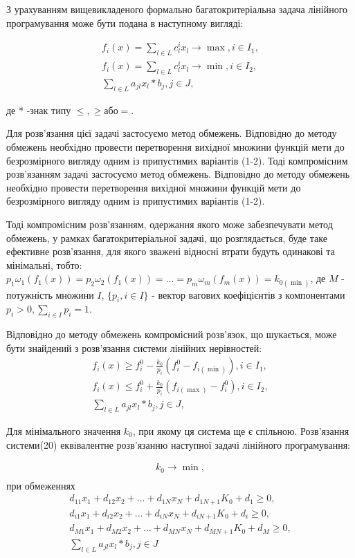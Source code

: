 З урахуванням вищевикладеного формально багатокритеріальна задача лінійного програмування може бути подана в наступному вигляді:

\begin{gather*}
	f_i(x) = \sum_{l \in L}{c_l^i x_l} \to \max, i \in I_1, \\
	f_i(x) = \sum_{l \in L}{c_l^i x_l} \to \min, i \in I_2, \\
	\sum_{l \in L}{a_{jl} x_l * b_j}, j \in J,
\end{gather*}

де * -знак типу $\leq, \geq або =$.

Для розв'язання цієї задачі застосуємо метод обмежень. 
Відповідно до методу обмежень необхідно провести перетворення вихідної множини функцій мети до безрозмірного вигляду одним із припустимих варіантів (1-2). 
Тоді компромісним розв'язанням задачі застосуємо метод обмежень. 
Відповідно до методу обмежень необхідно провести перетворення вихідної множини функцій мети до безрозмірного вигляду одним із припустимих варіантів (1-2). 

Тоді компромісним розв'язанням, одержання якого може забезпечувати метод обмежень, у рамках багатокритеріальної задачі, що розглядається, буде таке ефективне розв'язання, для якого зважені відносні втрати будуть одинакові та мінімальні, тобто:
$p_1 \omega_1 (f_1(x)) = p_2 \omega_2 (f_1(x)) = ... = p_m \omega_m (f_m(x)) = k_{0 (\min)}$,
де $M$ - потужність множини $I$, $\{p_i, i \in I\}$ - вектор вагових коефіцієнтів з компонентами 
$p_i > 0, \sum_{i \in I}{p_i} = 1$.

Відповідно до методу обмежень компромісний розв'язок, що шукається, може бути знайдений з розв'язання системи лінійних нерівностей:
\begin{gather*}
	f_i(x) \geq f_{i}^0 - \frac{k_0}{p_i}(f_{i}^0 - f_{i(\min)}) , i \in I_1, \\
	f_i(x) \leq f_{i}^0 + \frac{k_0}{p_i}(f_{i(\max)} - f_{i}^0 ), i \in I_2, \\
	\sum_{l \in L}{a_{jl} x_l * b_j}, j \in J,
\end{gather*}

Для мінімального значення $k_0$, при якому ця система ще є спільною. Розв'язання системи(20) еквівалентне розв'язанню наступної задачі лінійного програмування:

\begin{gather*}
	k_0 \to \min, \\
\end{gather*}
при обмеженнях 
\begin{gather*}
	d_{11} x_1 	+ d_{12} x_2 + ... + d_{1N} x_N + d_{1 N+1} K_0 + d_1 \geq 0, \\
	d_{i1} x_1 	+ d_{i2} x_2 + ... + d_{iN} x_N + d_{i N+1} K_0 + d_i \geq 0, \\
	d_{M1} x_1 	+ d_{M2} x_2 + ... + d_{MN} x_N + d_{M N+1} K_0 + d_M \geq 0, \\
	\sum_{l \in L}{a_{jl} x_l * b_j}, j \in J \\
\end{gather*}

